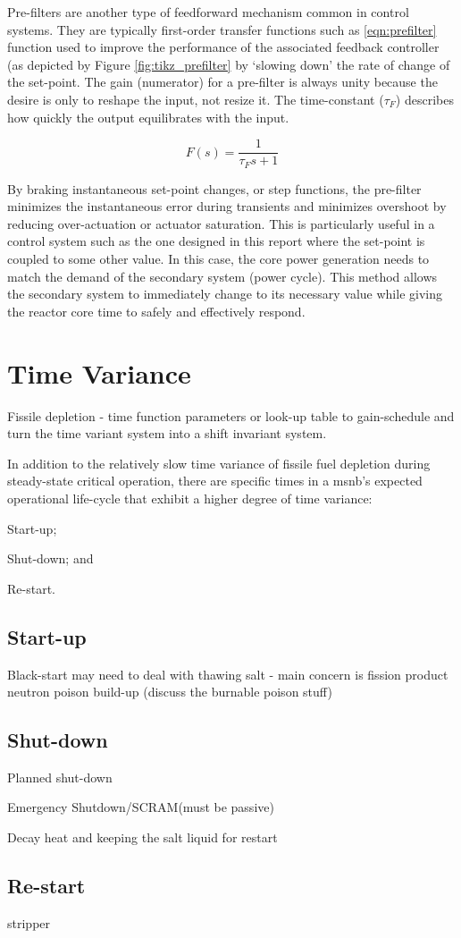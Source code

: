 Pre-filters are another type of feedforward mechanism common in control systems. They are typically first-order transfer functions such as \ref{eqn:prefilter} function used to improve the performance of the associated feedback controller (as depicted by Figure \ref{fig:tikz_prefilter} by `slowing down' the rate of change of the set-point. The gain (numerator) for a pre-filter is always unity because the desire is only to reshape the input, not resize it. The time-constant ($\tau_F$) describes how quickly the output equilibrates with the input. 

\begin{equation}\label{eqn:prefilter}
    F(s)=\frac{1}{\tau_F s+1}    
\end{equation}

By braking instantaneous set-point changes, or step functions, the pre-filter minimizes the instantaneous error during transients and minimizes overshoot by reducing over-actuation or actuator saturation.  This is particularly useful in a control system such as the one designed in this report where the set-point is coupled to some other value. In this case, the core power generation needs to match the demand of the secondary system (\eg power cycle). This method allows the secondary system to immediately change to its necessary value while giving the reactor core time to safely and effectively respond. 

\section{Time Variance}
Fissile depletion - time function parameters or look-up table to gain-schedule and turn the time variant system into a shift invariant system.

In addition to the relatively slow time variance of fissile fuel depletion during steady-state critical operation, there are specific times in a \acs{msnb}'s expected operational life-cycle that exhibit a higher degree of time variance: 
\begin{enumerate*}
\item Start-up; \item Shut-down; and \item Re-start.
\end{enumerate*}

\subsection{Start-up}
Black-start may need to deal with thawing salt - main concern is fission product neutron poison build-up (discuss the burnable poison stuff)

\subsection{Shut-down}
Planned shut-down

Emergency Shutdown/SCRAM(must be passive)

Decay heat and keeping the salt liquid for restart

\subsection{Re-start}
\Xe stripper



